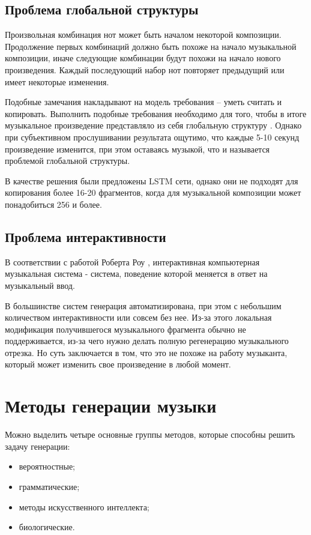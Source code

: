 \subsection{Проблема глобальной структуры}

Произвольная комбинация нот может быть началом некоторой композиции. Продолжение первых комбинаций должно быть похоже на начало музыкальной композиции, иначе следующие комбинации будут похожи на начало нового произведения. Каждый последующий набор нот повторяет предыдущий или имеет некоторые изменения. 

Подобные замечания накладывают на модель требования -- уметь считать и копировать. Выполнить подобные требования необходимо для того, чтобы в итоге музыкальное произведение представляло из себя глобальную структуру \cite{music-issues}. Однако при субъективном прослушивании результата ощутимо, что каждые 5-10 секунд произведение изменится, при этом оставаясь музыкой, что и называется проблемой глобальной структуры.

В качестве решения были предложены LSTM \cite{lstm} сети, однако они не подходят для копирования более 16-20 фрагментов, когда для музыкальной композиции может понадобиться 256 и более.


\subsection{Проблема интерактивности}

В соответствии с работой Роберта Роу \cite{music-issues}, интерактивная компьютерная музыкальная система - система, поведение которой меняется в ответ на музыкальный ввод.

В большинстве систем генерация автоматизирована, при этом с небольшим количеством интерактивности или совсем без нее. Из-за этого локальная модификация получившегося музыкального фрагмента обычно не поддерживается, из-за чего нужно делать полную регенерацию музыкального отрезка. Но суть заключается в том, что это не похоже на работу музыканта, который может изменить свое произведение в любой момент.


\section{Методы генерации музыки}

Можно выделить четыре основные группы методов, которые способны решить задачу генерации:

\begin{itemize}
    \item вероятностные;
    \item грамматические;
    \item методы искусственного интеллекта;
    \item биологические.
\end{itemize}


